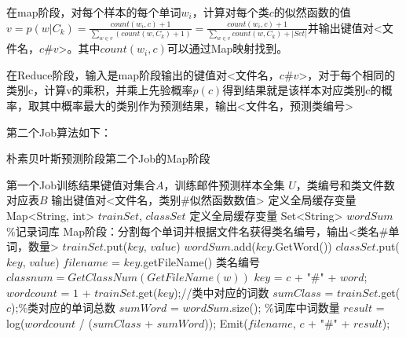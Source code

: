 \documentclass[lang=cn,11pt]{elegantpaper}
\begin{document}
在map阶段，对每个样本的每个单词$w_i$，计算对每个类$c$的似然函数的值$v=p(w|C_{k})=\frac{count(w_i, c)+1}{\sum_{w \in v}(count(w, C_{k})+1)}=\frac{count(w_i, c)+1}{\sum_{w \in v}count(w, C_{k})+|Set|}$并输出键值对<文件名，$c\#v$>。其中$count(w_i, c)$可以通过Map映射找到。

在Reduce阶段，输入是map阶段输出的键值对<文件名，$c\#v$>，对于每个相同的类别c，计算v的乘积，并乘上先验概率$p(c)$得到结果就是该样本对应类别c的概率，取其中概率最大的类别作为预测结果，输出<文件名，预测类编号>

第二个Job算法如下：

\begin{algorithm}[H]
  \caption{朴素贝叶斯预测阶段第二个Job的Map阶段}
  \label{alg:Framwork}
  \begin{algorithmic}[1]
    \Require
    第一个Job训练结果键值对集合$A$，训练邮件预测样本全集 $U$，类编号和类文件数对应表$B$
    \Ensure
    输出键值对<文件名，类别\#似然函数数值>
  \State 定义全局缓存变量 Map<String, int> $trainSet$, $classSet$
  \State 定义全局缓存变量 Set<String> $wordSum$  \quad  \%记录词库
  \State Map阶段：分割每个单词并根据文件名获得类名编号，输出<类名\#单词，数量>
      \State $trainSet$.put($key$, $value$)
      \State $wordSum$.add($key$.GetWord())
    \EndFor
      \State $classSet$.put($key$, $value$)
    \EndFor
  \EndFunction
    \State $filename$ = $key$.getFileName()
      \State 类名编号$classnum = GetClassNum(GetFileName(w))$
        \State $key$ = $c$ + "\#" + $word$;
        \State $wordcount$ = $1$ + $trainSet$.get($key$);//类中对应的词数
        \State $sumClass$ = $trainSet$.get($c$);\quad  \%类对应的单词总数
        \State $sumWord$ = $wordSum$.size(); \quad  \%词库中词数量
        \State $result$ = log($wordcount$ / ($sumClass$ + $sumWord$));
        \State Emit($filename$, $c$ + "\#" + $result$);
   		\EndFor
   \EndFor
  \EndFunction
	\end{algorithmic}
\end{algorithm}
\end{document}
